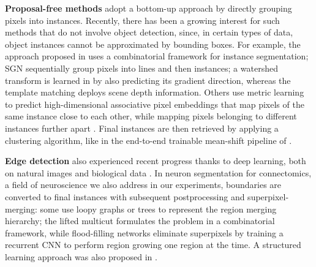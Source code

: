 \textbf{Proposal-free methods} adopt a bottom-up approach by directly grouping pixels into instances. Recently, there has been a growing interest for such  methods that do not involve object detection, since, in certain types of data, object instances cannot be approximated by bounding boxes. For example, the approach proposed in \cite{kirillov2017instancecut} uses a combinatorial framework for instance segmentation; SGN \cite{liu2017sgn} sequentially group pixels into lines and then instances;
a watershed transform is learned in \cite{bai2017deep} by also predicting its gradient direction, whereas the template matching \cite{uhrig2016pixel} deploys scene depth information.
Others use metric learning to predict high-dimensional associative pixel embeddings that map pixels of the same instance close to each other, while mapping pixels belonging to different instances further apart \cite{fathi2017semantic,newell2017associative,de2017semantic,kulikov2018instance}. %
Final instances are then retrieved by applying a clustering algorithm, like in the end-to-end trainable mean-shift pipeline of \cite{kong2018recurrentPix}.

\textbf{Edge detection} also experienced recent progress thanks to deep learning, both on natural images \cite{xie2015holistically,kokkinos2015pushing} and biological data \cite{lee2017superhuman,schmidt2018cell,meirovitch2016multi,ciresan2012deep}. In neuron segmentation for connectomics, a field of neuroscience we also address in our experiments, boundaries are converted to final instances with subsequent postprocessing and superpixel-merging:
some use loopy graphs \cite{kaynig2015large,krasowski2015improving} or trees \cite{meirovitch2016multi,liu2016sshmt,liu2014modular,funke2015learning,uzunbas2016efficient} to represent the region merging hierarchy; the lifted multicut \cite{beier2017multicut} formulates the problem in a combinatorial framework, while flood-filling networks \cite{januszewski2018high} eliminate superpixels by training a recurrent CNN to perform region growing one region at the time. A structured learning approach was also proposed in \cite{funke2018large,turaga2009maximin}.

